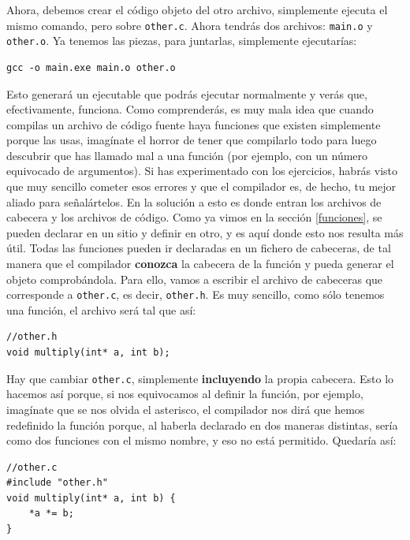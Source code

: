 \documentclass[a4paper]{article}
\begin{document}
Ahora, debemos crear el código objeto del otro archivo, simplemente ejecuta
el mismo comando, pero sobre \verb!other.c!. Ahora tendrás dos archivos:
\verb!main.o! y \verb!other.o!. Ya tenemos las piezas, para juntarlas,
simplemente ejecutarías:
\begin{verbatim}
gcc -o main.exe main.o other.o
\end{verbatim}

Esto generará un ejecutable que podrás ejecutar normalmente y verás que,
efectivamente, funciona. Como comprenderás, es muy mala idea que cuando compilas
un archivo de código fuente haya funciones que existen simplemente porque las
usas, imagínate el horror de tener que compilarlo todo para luego descubrir que
has llamado mal a una función (por ejemplo, con un número equivocado de
argumentos). Si has experimentado con los ejercicios, habrás visto que muy
sencillo cometer esos errores y que el compilador es, de hecho, tu mejor aliado
para señalártelos. En la solución a esto es donde entran los archivos de cabecera
y los archivos de código. Como ya vimos en la sección \ref{funciones}, se pueden
declarar en un sitio y definir en otro, y es aquí donde esto nos resulta más
útil. Todas las funciones pueden ir declaradas en un fichero de cabeceras, de
tal manera que el compilador \textbf{conozca} la cabecera de la función y
pueda generar el objeto comprobándola. Para ello, vamos a escribir el archivo
de cabeceras que corresponde a \verb!other.c!, es decir, \verb!other.h!. Es muy
sencillo, como sólo tenemos una función, el archivo será tal que así:


\noindent
\begin{minipage}[H]{\linewidth}
\mbox{}
\begin{lstlisting}[style=C,
caption={Archivo de cabecera},
label={lst:headerFile}]
//other.h
void multiply(int* a, int b);
\end{lstlisting}
\end{minipage}

Hay que cambiar \verb!other.c!, simplemente \textbf{incluyendo} la propia
cabecera. Esto lo hacemos así porque, si nos equivocamos al definir la función,
por ejemplo, imagínate que se nos olvida el asterisco, el compilador nos dirá
que hemos redefinido la función porque, al haberla declarado en dos maneras
distintas, sería como dos funciones con el mismo nombre, y eso no está
permitido. Quedaría así:


\noindent
\begin{minipage}[H]{\linewidth}
\mbox{}
\begin{lstlisting}[style=C,
caption={Archivo de definiciones con cabecera incluida},
label={lst:fileCofHeader}]
//other.c
#include "other.h"
void multiply(int* a, int b) {
    *a *= b;
}
\end{lstlisting}
\end{minipage}
\end{document}
